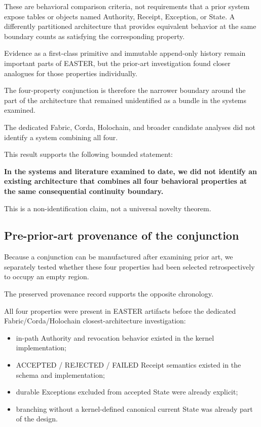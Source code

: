 \documentclass[11pt]{article}
\begin{document}
These are behavioral comparison criteria, not requirements that a prior system expose tables or objects named Authority, Receipt, Exception, or State. A differently partitioned architecture that provides equivalent behavior at the same boundary counts as satisfying the corresponding property.

Evidence as a first-class primitive and immutable append-only history remain important parts of EASTER, but the prior-art investigation found closer analogues for those properties individually.

The four-property conjunction is therefore the narrower boundary around the part of the architecture that remained unidentified as a bundle in the systems examined.

The dedicated Fabric, Corda, Holochain, and broader candidate analyses did not identify a system combining all four.

This result supports the following bounded statement:

\textbf{In the systems and literature examined to date, we did not identify an existing architecture that combines all four behavioral properties at the same consequential continuity boundary.}

This is a non-identification claim, not a universal novelty theorem.

\subsection{Pre-prior-art provenance of the conjunction}

Because a conjunction can be manufactured after examining prior art, we separately tested whether these four properties had been selected retrospectively to occupy an empty region.

The preserved provenance record supports the opposite chronology.

All four properties were present in EASTER artifacts before the dedicated Fabric/Corda/Holochain closest-architecture investigation:

\begin{itemize}
\item in-path Authority and revocation behavior existed in the kernel implementation;
\item ACCEPTED / REJECTED / FAILED Receipt semantics existed in the schema and implementation;
\item durable Exceptions excluded from accepted State were already explicit;
\item branching without a kernel-defined canonical current State was already part of the design.
\end{itemize}
\end{document}
